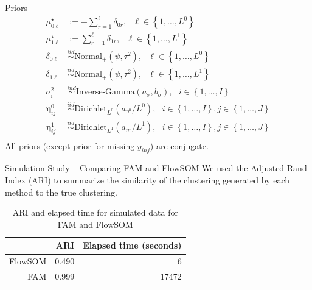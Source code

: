\documentclass[ignorenonframetext,]{beamer}
\newcommand{\iid}{\overset{iid}{\sim}}
\newcommand{\bc}[1]{ \left\{#1\right\} }
\newcommand{\ind}{\overset{ind}{\sim}}
\def\mus{\mu^\star}
\begin{document}
\begin{frame}{Priors}
\begin{align*}
\mus_{0\ell} &:= -\sum_{r=1}^\ell \delta_{0r}, ~~~ \ell \in \bc{1, \dots,L^0} \\
\mus_{1\ell} &:= \sum_{r=1}^\ell \delta_{1r}, ~~~ \ell \in \bc{1, \dots,L^1} \\
\delta_{0\ell} &\iid \text{Normal}_+(\psi, \tau^2), ~~~ \ell \in \bc{1, \dots,L^0} \\
\delta_{1\ell} &\iid \text{Normal}_+(\psi, \tau^2), ~~~ \ell \in \bc{1, \dots,L^1} \\
\sigma^2_i &\ind \text{Inverse-Gamma}(a_\sigma, b_\sigma), ~~~ i \in \bc{1, \dots, I} \\
\bm\eta^0_{ij} &\iid \text{Dirichlet}_{L^0}(a_{\eta^0}/L^0), ~~~ i \in \bc{1, \dots,I}, j \in \bc{1, \dots,J} \\
\bm\eta^1_{ij} &\iid \text{Dirichlet}_{L^1}(a_{\eta^1}/L^1), ~~~ i \in \bc{1, \dots,I}, j \in \bc{1, \dots,J} \\
\end{align*}
All priors (except prior for missing $y_{inj}$) are conjugate.
\end{frame}



\begin{frame}{Simulation Study -- Comparing FAM and FlowSOM}
We used the Adjusted Rand Index (ARI) to summarize the similarity of the
clustering generated by each method to the true clustering. 

\begin{table}
\begin{center}
\begin{tabular}{rrr}
  \hline
 & ARI & Elapsed time (seconds) \\ 
  \hline
  FlowSOM & 0.490 & 6 \\ 
  FAM & 0.999 & 17472 \\ 
   \hline
\end{tabular}
\end{center}
\caption{ARI and elapsed time for simulated data for FAM and FlowSOM}
\end{table}
\end{frame}
\end{document}
